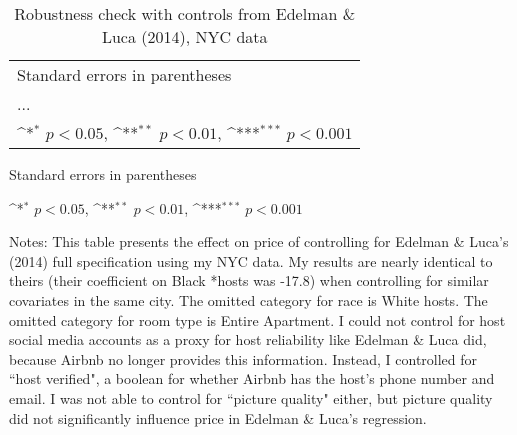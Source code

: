 \documentclass[11pt, oneside]{article}
\begin{document}
\begin{table}[htbp]\centering
	\def\sym#1{\ifmmode^{#1}\else\(^{#1}\)\fi}
	\caption{Robustness check with controls from Edelman \& Luca (2014), NYC data}
	\begin{tabular}{l*{1}{c}}
		\hline\hline
		
		\hline\hline
		\multicolumn{2}{l}{\footnotesize Standard errors in parentheses}\\
		\multicolumn{2}{l}{\footnotesize ...}\\
		\multicolumn{2}{l}{\footnotesize \sym{*} \(p<0.05\), \sym{**} \(p<0.01\), \sym{***} \(p<0.001\)}\\
	\end{tabular}
	\begin{tablenotes}
		\item \footnotesize Standard errors in parentheses
		\item \footnotesize \sym{*} \(p<0.05\), \sym{**} \(p<0.01\), \sym{***} \(p<0.001\)
		
		\item Notes: This table presents the effect on price of controlling for Edelman \& Luca's (2014) full specification using my NYC data. My results are nearly identical to theirs (their coefficient on Black *hosts was -17.8) when controlling for similar covariates in the same city. The omitted category for race is White hosts. The omitted category for room type is Entire Apartment. I could not control for host social media accounts as a proxy for host reliability like Edelman \& Luca did, because Airbnb no longer provides this information. Instead, I controlled for ``host verified", a boolean for whether Airbnb has the host's phone number and email. I was not able to control for ``picture quality" either, but picture quality did not significantly influence price in Edelman \& Luca's regression.
	\end{tablenotes}
\end{table}
\end{document}
